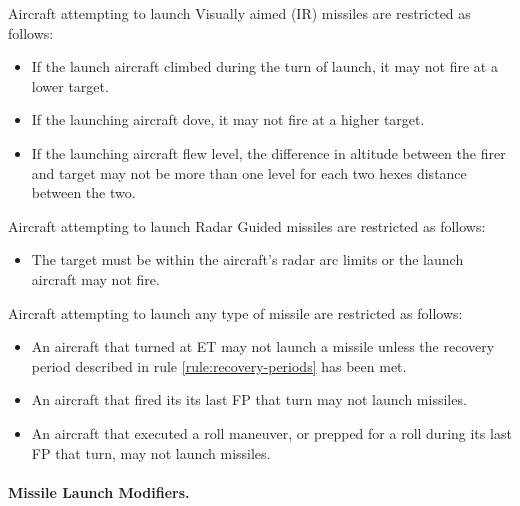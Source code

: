 Aircraft attempting to launch Visually aimed (IR) missiles are restricted as follows:
 
\begin{itemize}

    \item If the launch aircraft climbed during the turn of launch, it may not fire at a lower target.

    \item If the launching aircraft dove, it may not fire at a higher target.

    \item If the launching aircraft flew level, the difference in altitude between the firer and target may not be more than one level for each two hexes distance between the two.

\end{itemize}

Aircraft attempting to launch Radar Guided missiles are restricted as follows:

\begin{itemize}

    \item The target must be within the aircraft's radar arc limits or the launch aircraft may not fire.

\end{itemize}

Aircraft attempting to launch any type of missile are restricted as follows:

\begin{itemize}

    \item An aircraft that turned at ET may not launch a missile unless the recovery period described in rule \ref{rule:recovery-periods} has been met.

    \item An aircraft that fired its  its last FP that turn may not launch missiles.

    \item An aircraft that executed a roll maneuver, or prepped for a roll during its last FP that turn, may not launch missiles.
    
\end{itemize}

\paragraph{Missile Launch Modifiers.} 
\label{rule:missile-launch-modifiers}

